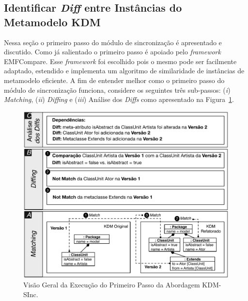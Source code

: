 
\subsection{Identificar \textit{Diff} entre Instâncias do Metamodelo KDM}\label{sec:diff_entre_kdm}

Nessa seção o primeiro passo do módulo de sincronização é apresentado e discutido. Como já salientado o primeiro passo é apoiado pelo \textit{framework} EMFCompare. Esse \textit{framework} foi escolhido pois o mesmo pode ser facilmente adaptado, estendido e implementa um algoritmo de similaridade de instâncias de metamodelo eficiente. A fim de entender melhor como o primeiro passo do módulo de sincronização funciona, considere os seguintes três sub-passos: (\textit{i}) \textit{Matching}, (\textit{ii}) \textit{Diffing} e (\textit{iii}) Análise dos \textit{Diffs} como apresentado na Figura~\ref{fig:diff_emf_compare}. 

\begin{figure}[h]
	\centering
	\caption{Visão Geral da Execução do Primeiro Passo da Abordagem KDM-SInc.}
	\label{fig:diff_emf_compare}
	\includegraphics[scale=0.7]{images/matching_diffing_analise_3}
	\fautor
\end{figure}

